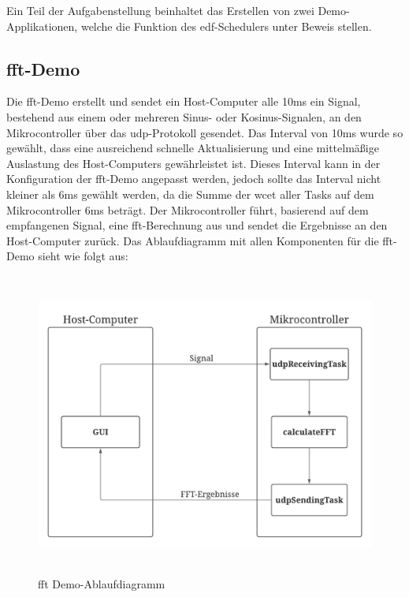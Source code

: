\documentclass[../EDF Master Thesis.tex]{subfiles}
\begin{document}
    Ein Teil der Aufgabenstellung beinhaltet das Erstellen von zwei Demo-Applikationen, welche die Funktion des \ac{edf}-Schedulers unter Beweis stellen.

    \subsection{\acf{fft}-Demo} \label{section:fft_demo}

        Die \ac{fft}-Demo erstellt und sendet ein Host-Computer alle 10ms ein Signal, bestehend aus einem oder mehreren Sinus- oder Kosinus-Signalen, an den Mikrocontroller über das \ac{udp}-Protokoll gesendet.
        Das Interval von 10ms wurde so gewählt, dass eine ausreichend schnelle Aktualisierung und eine mittelmäßige Auslastung des Host-Computers gewährleistet ist.
        Dieses Interval kann in der Konfiguration der \ac{fft}-Demo angepasst werden, jedoch sollte das Interval nicht kleiner als 6ms gewählt werden, da die Summe der \ac{wcet} aller Tasks auf dem Mikrocontroller 6ms beträgt.
        Der Mikrocontroller führt, basierend auf dem empfangenen Signal, eine \ac{fft}-Berechnung aus und sendet die Ergebnisse an den Host-Computer zurück.
        Das Ablaufdiagramm mit allen Komponenten für die \ac{fft}-Demo sieht wie folgt aus:

        \begin{figure}[H]
            \centering
            \includegraphics[height=10cm, width=14cm]{./attachments/FFT Ablauf.pdf}
            \caption{\ac{fft} Demo-Ablaufdiagramm}
            \label{fig:fft_demo_ablaufdiagramm}
        \end{figure}
\end{document}
